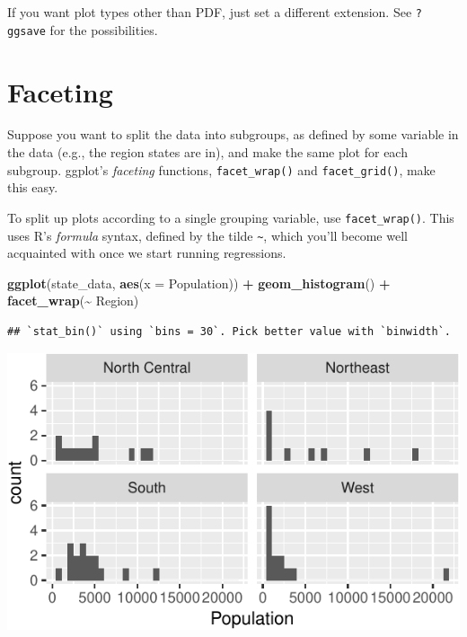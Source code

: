 \documentclass[
  12pt,
  oneside,openany]{book}
\newenvironment{Shaded}{\begin{snugshade}}{\end{snugshade}}
\newcommand{\DataTypeTok}[1]{\textcolor[rgb]{0.13,0.29,0.53}{#1}}
\newcommand{\KeywordTok}[1]{\textcolor[rgb]{0.13,0.29,0.53}{\textbf{#1}}}
\newcommand{\NormalTok}[1]{#1}
\newcommand{\OperatorTok}[1]{\textcolor[rgb]{0.81,0.36,0.00}{\textbf{#1}}}
\newcommand{\StringTok}[1]{\textcolor[rgb]{0.31,0.60,0.02}{#1}}
\begin{document}
If you want plot types other than PDF, just set a different extension. See \texttt{?ggsave} for the possibilities.

\hypertarget{faceting}{%
\section{Faceting}\label{faceting}}

Suppose you want to split the data into subgroups, as defined by some variable in the data (e.g., the region states are in), and make the same plot for each subgroup. ggplot's \emph{faceting} functions, \texttt{facet\_wrap()} and \texttt{facet\_grid()}, make this easy.

To split up plots according to a single grouping variable, use \texttt{facet\_wrap()}. This uses R's \emph{formula} syntax, defined by the tilde \texttt{\textasciitilde{}}, which you'll become well acquainted with once we start running regressions.

\begin{Shaded}
\begin{Highlighting}[]
\KeywordTok{ggplot}\NormalTok{(state\_data, }\KeywordTok{aes}\NormalTok{(}\DataTypeTok{x =}\NormalTok{ Population)) }\OperatorTok{+}
\StringTok{  }\KeywordTok{geom\_histogram}\NormalTok{() }\OperatorTok{+}
\StringTok{  }\KeywordTok{facet\_wrap}\NormalTok{(}\OperatorTok{\textasciitilde{}}\StringTok{ }\NormalTok{Region)}
\end{Highlighting}
\end{Shaded}

\begin{verbatim}
## `stat_bin()` using `bins = 30`. Pick better value with `binwidth`.
\end{verbatim}

\includegraphics{pdaps_files/figure-latex/facet-wrap-1.pdf}
\end{document}
